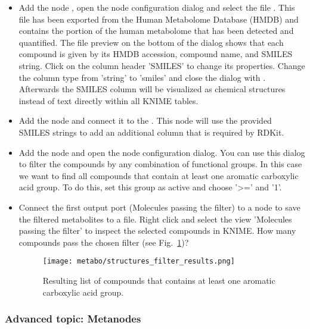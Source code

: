 \begin{itemize}
\item Add the node , open the node configuration dialog and select the file . This file has been exported from the Human Metabolome Database (HMDB) and contains the portion of the human metabolome that has been detected and quantified. The file preview on the bottom of the dialog shows that each compound is given by its HMDB accession, compound name, and SMILES string. Click on the column header 'SMILES' to change its properties. Change the column type from 'string' to 'smiles' and close the dialog with . Afterwards the SMILES column will be visualized as chemical structures instead of text directly within all KNIME tables.

\item Add the node  and connect it to the  . This node will use the provided SMILES strings to add an additional column that is required by RDKit.

\item Add the node  and open the node configuration dialog. You can use this dialog to filter the compounds by any combination of functional groups. In this case we want to find all compounds that contain at least one aromatic carboxylic acid group. To do this, set this group as active and choose '>=' and '1'.

\item Connect the first output port (Molecules passing the filter) to a  node to save the filtered metabolites to a file. Right click  and select the view 'Molecules passing the filter' to inspect the selected compounds in KNIME. How many compounds pass the chosen filter (see Fig.~\ref{fig:structures_filter_results})?

\begin{figure}
\centering
\texttt{[image: metabo/structures\_filter\_results.png]}
\caption{Resulting list of compounds that contains at least one aromatic carboxylic acid group.}
\label{fig:structures_filter_results}
\end{figure}

\end{itemize}


\subsubsection{Advanced topic: Metanodes}

